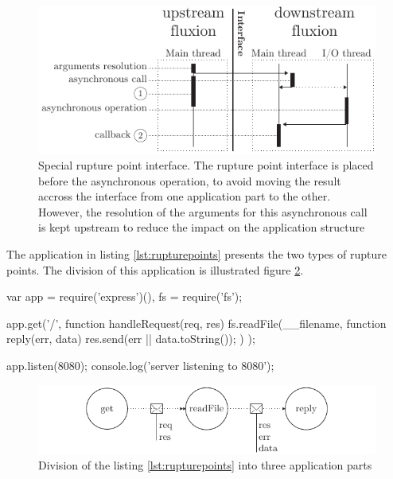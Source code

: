 \begin{figure}[h!]
\begin{center}
  \includegraphics[width=\linewidth]{ressources/specialrp.pdf}
  \caption{Special rupture point interface. \textnormal{The rupture point interface is placed before the asynchronous operation, to avoid moving the result accross the interface from one application part to the other. However, the resolution of the arguments for this asynchronous call is kept upstream to reduce the impact on the application structure}}
  \label{fig:specialrp}
\end{center}
\end{figure}

The application in listing \ref{lst:rupturepoints} presents the two types of rupture points.
The division of this application is illustrated figure \ref{fig:flux-2}.

\begin{code}[js, caption={Example of an application presenting the two types of rupture points. \textnormal{A \texttt{start} with the call to \texttt{app.get()}, and a \texttt{post} with the call to \texttt{fs.readFile()}}},label={lst:rupturepoints}]
var app = require('express')(),
    fs = require('fs');

app.get('/', function handleRequest(req, res) {
  fs.readFile(__filename, function reply(err, data) {
    res.send(err || data.toString());
  })
});

app.listen(8080);
console.log('server listening to 8080');
\end{code}

\begin{figure}[h!]
\begin{center}
  \includegraphics[width=\linewidth]{ressources/flux-2.pdf}
  \caption{Division of the listing \ref{lst:rupturepoints} into three application parts}
  \label{fig:flux-2}
\end{center}
\end{figure}


